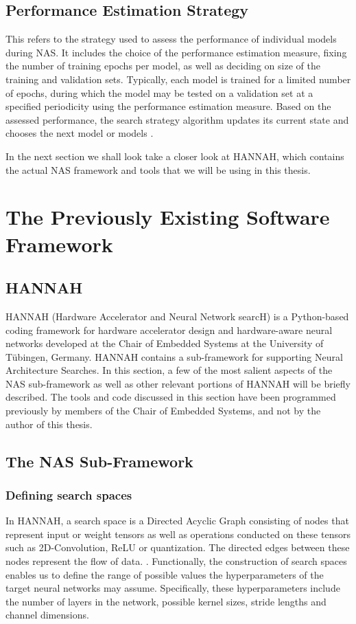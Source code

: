 \documentclass[11pt,a4paper, open=any]{scrbook}
\newcounter{algorithm}[chapter]
\begin{document}
\subsection{Performance Estimation Strategy}
This refers to the strategy used to assess the performance of individual models during NAS. It includes the choice of the performance estimation measure, fixing the number of training epochs per model, as well as deciding on size of the training and validation sets. Typically, each model is trained for a limited number of epochs, during which the model may be tested on a validation set at a specified periodicity using the performance estimation measure. Based on the assessed performance, the search strategy algorithm updates its current state and chooses the next model or models \cite[8-12]{elsken19}.

In the next section we shall look take a closer look at HANNAH, which contains the actual NAS framework and tools that we will be using in this thesis.


\section{The Previously Existing Software Framework}
\subsection{HANNAH}
HANNAH (Hardware Accelerator and Neural Network searcH) is a Python-based coding framework for hardware accelerator design and hardware-aware neural networks developed at the Chair of Embedded Systems at the University of Tübingen, Germany. HANNAH contains a sub-framework for supporting Neural Architecture Searches. In this section, a few of the most salient aspects of the NAS sub-framework as well as other relevant portions of HANNAH will be briefly described. The tools and code discussed in this section have been programmed previously by members of the Chair of Embedded Systems, and not by the author of this thesis.

\subsection{The NAS Sub-Framework}
\subsubsection{Defining search spaces}
In HANNAH, a search space is a Directed Acyclic Graph consisting of nodes that represent input or weight tensors as well as operations conducted on these tensors such as 2D-Convolution, ReLU or quantization. The directed edges between these nodes represent the flow of data. \cite{ekutesSearchSpaces}. Functionally, the construction of search spaces enables us to define the range of possible values the hyperparameters of the target neural networks may assume. Specifically, these hyperparameters include the number of layers in the network, possible kernel sizes, stride lengths and channel dimensions. 
\end{document}
